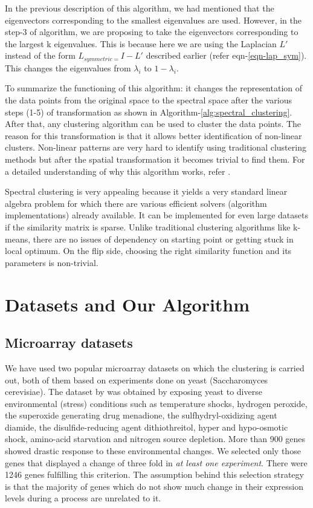 In the previous description of this algorithm, we had mentioned that the eigenvectors corresponding to the smallest eigenvalues are used. However, in the step-3 of algorithm, we are proposing to take the eigenvectors corresponding to the largest k eigenvalues. This is because here we are using the Laplacian $L'$ instead of the form $L_{symmetric=}I-L'$ described earlier (refer eqn-\ref{eqn-lap_sym}). This changes the eigenvalues from $\lambda_{i}$ to $1-\lambda_{i}$.

To summarize the functioning of this algorithm: it changes the representation of the data points from the original space to the spectral space after the various steps (1-5) of transformation as shown in Algorithm-\ref{alg:spectral_clustering}. After that, any clustering algorithm can be used to cluster the data points. The reason for this transformation is that it allows better identification of non-linear clusters. Non-linear patterns are very hard to identify using traditional clustering methods but after the spatial transformation it becomes trivial to find them. For a detailed understanding of why this algorithm works, refer \citet{ng2001onspectral}. 

Spectral clustering is very appealing because it yields a very standard linear algebra problem for which there are various efficient solvers (algorithm implementations) already available. It can be implemented for even large datasets if the similarity matrix is sparse. Unlike traditional clustering algorithms like k-means, there are no issues of dependency on starting point or getting stuck in local optimum. On the flip side, choosing the right similarity function and its parameters is non-trivial.

\section{Datasets and Our Algorithm} \label{chap2:sec:materials}

\subsection{Microarray datasets}
We have used two popular microarray datasets on which the clustering is carried out, both of them based on experiments done on yeast (Saccharomyces cerevisiae). The dataset by \citet{gasch00genomicexpn} was obtained by exposing yeast to diverse environmental (stress) conditions such as temperature shocks, hydrogen peroxide, the superoxide generating drug menadione, the sulfhydryl-oxidizing agent diamide, the disulfide-reducing agent dithiothreitol, hyper and hypo-osmotic shock, amino-acid starvation and nitrogen source depletion. More than 900 genes showed drastic response to these environmental changes. We selected only those genes that displayed a change of three fold in \textit{at least one experiment}. There were 1246 genes fulfilling this criterion. The assumption behind this selection strategy is that the majority of genes which do not show much change in their expression levels during a process are unrelated to it.

